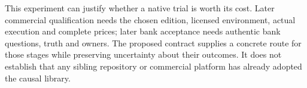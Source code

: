 This experiment can justify whether a native trial is worth its cost. Later
commercial qualification needs the chosen edition, licensed environment,
actual execution and complete prices; later bank acceptance needs authentic
bank questions, truth and owners. The proposed contract supplies a concrete
route for those stages while preserving uncertainty about their outcomes.
It does not establish that any sibling repository or commercial platform has
already adopted the causal library.

